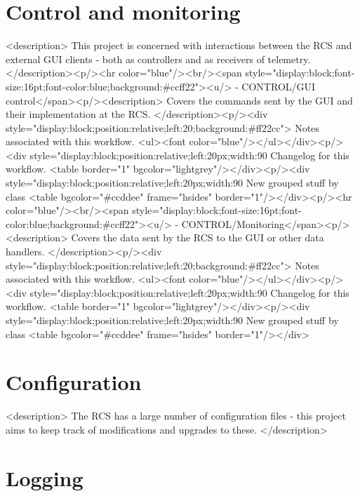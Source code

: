     \section{Control and monitoring}

    <description>
      This project is concerned with interactions between the RCS and external GUI clients - both as controllers
      and as receivers of telemetry.
    </description><p/><hr color="blue"/><br/><span style="display:block;font-size:16pt;font-color:blue;background:#ccff22"><u/> -    CONTROL/GUI control</span><p/><description>
	Covers the commands sent by the GUI and their implementation at the RCS.
	</description><p/><div style="display:block;position:relative;left:20;background:#ff22cc">
      Notes associated with this workflow.
      <ul><font color="blue"/></ul></div><p/><div style="display:block;position:relative;left:20px;width:90%
      Changelog for this workflow.
      <table border="1" bgcolor="lightgrey"/></div><p/><div style="display:block;position:relative;left:20px;width:90%
     New grouped stuff by class
     <table bgcolor="#ccddee" frame="hsides" border="1"/></div><p/><hr color="blue"/><br/><span style="display:block;font-size:16pt;font-color:blue;background:#ccff22"><u/> -    CONTROL/Monitoring</span><p/><description>
	Covers the data sent by the RCS to the GUI or other data handlers.
      </description><p/><div style="display:block;position:relative;left:20;background:#ff22cc">
      Notes associated with this workflow.
      <ul><font color="blue"/></ul></div><p/><div style="display:block;position:relative;left:20px;width:90%
      Changelog for this workflow.
      <table border="1" bgcolor="lightgrey"/></div><p/><div style="display:block;position:relative;left:20px;width:90%
     New grouped stuff by class
     <table bgcolor="#ccddee" frame="hsides" border="1"/></div>

    \section{Configuration}

    <description>
      The RCS has a large number of configuration files - this project aims to keep track of modifications
      and upgrades to these.
    </description>

    \section{Logging}

